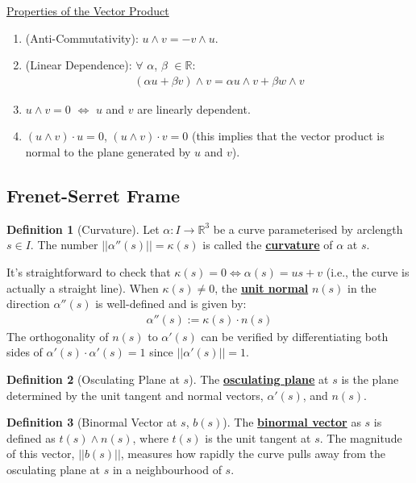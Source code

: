 \documentclass[11pt]{scrartcl}
\newcommand{\R}[0]{\mathbb{R}}
\theoremstyle{definition}
\newtheorem{definition}{Definition}
\theoremstyle{remark}
\newcommand{\dfn}[1]{\textbf{\underline{#1}}}
\begin{document}
\underline{Properties of the Vector Product} 
\begin{enumerate}[noitemsep]
	\item (Anti-Commutativity): $u \wedge v = -v \wedge u$. 
	\item (Linear Dependence): $\forall$ $\alpha$, $\beta$ $\in \R$: 
	\begin{align*}
		(\alpha u + \beta v) \wedge v = \alpha u \wedge v + \beta w \wedge v
	\end{align*}
	\item $u \wedge v = 0$ $\iff$ $u$ and $v$ are linearly dependent. 
	\item $(u \wedge v) \cdot u =0$, $(u \wedge v) \cdot v =0$ (this implies that the vector product is normal to the plane generated by $u$ and $v$). 
\end{enumerate}

\subsection{Frenet-Serret Frame} %

\begin{definition}[Curvature]
	Let $\alpha: I \rightarrow \R^3$ be a curve parameterised by arclength $s \in I$. The number $|| \alpha''(s) || = \kappa (s)$ is called the \dfn{curvature} of $\alpha$ at $s$. 
\end{definition}
It's straightforward to check that $\kappa(s) = 0 \iff \alpha(s) = us + v$ (i.e., the curve is actually a straight line). When $\kappa(s) \neq 0$, the \dfn{unit normal} $n(s)$ in the direction $\alpha''(s)$ is well-defined and is given by: 
\begin{align*}
	\alpha''(s) := \kappa(s) \cdot n(s)
\end{align*}
The orthogonality of $n(s)$ to $\alpha'(s)$ can be verified by differentiating both sides of $\alpha'(s) \cdot \alpha'(s) = 1$ since $||\alpha'(s)|| =1$. 

\begin{definition}[Osculating Plane at $s$]
	The \dfn{osculating plane} at $s$ is the plane determined by the unit tangent and normal vectors, $\alpha'(s)$, and $n(s)$. 
\end{definition}

\begin{definition}[Binormal Vector at $s$, $b(s)$] 
	The \dfn{binormal vector} as $s$ is defined as $t(s) \wedge n(s)$, where $t(s)$ is the unit tangent at $s$. The magnitude of this vector, $||b(s)||$, measures how rapidly the curve pulls away from the osculating plane at $s$ in a neighbourhood of $s$. 
\end{definition}
\end{document}
